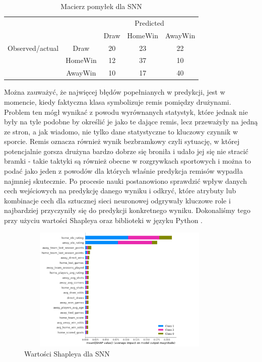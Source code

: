 \begin{center}
\begin{table}[H]
\renewcommand{\arraystretch}{1.5}
\caption{Macierz pomyłek dla SNN}
\label{tab:macierzSNN}
\begin{center}
\begin{tabular}{|c|c|c|c|c|}
   \cline{3-5} 
   \multicolumn{1}{c}{} & & \multicolumn{3}{c|}{Predicted} \\ \cline{3-5}
   \multicolumn{1}{c}{} & & Draw & HomeWin & AwayWin \\ \hline
   
   {Observed/actual}
   & Draw & 20 & 23 & 22 \\ \cline{2-5}
   & HomeWin & 12 & 37 & 10  \\ \cline{2-5}
   & AwayWin & 10 & 17 & 40 \\ \hline
\end{tabular}
\end{center}
\end{table}
\end{center}
Można zauważyć, że najwięcej błędów popełnianych w predykcji, jest w momencie, kiedy faktyczna klasa symbolizuje remis pomiędzy drużynami. Problem ten mógł wynikać z powodu wyrównanych statystyk, które jednak nie były na tyle podobne by określić je jako te dające remis, lecz przeważyły na jedną ze stron, a jak wiadomo, nie tylko dane statystyczne to kluczowy czynnik w sporcie. Remis oznacza również wynik bezbramkowy czyli sytuację, w której potencjalnie gorsza drużyna bardzo dobrze się broniła i udało jej się nie stracić bramki - takie taktyki są również obecne w rozgrywkach sportowych i można to podać jako jeden z powodów dla których właśnie predykcja remisów wypadła najmniej skutecznie.
Po procesie nauki postanowiono sprawdzić wpływ danych cech wejściowych na predykcję danego wyniku i odkryć, które atrybuty lub kombinacje cech dla sztucznej sieci neuronowej odgrywały kluczowe role i najbardziej przyczyniły się do predykcji konkretnego wyniku. Dokonaliśmy tego przy użyciu wartości Shapleya \cite{shapley} oraz biblioteki w języku Python  \cite{NIPS2017_7062}.
\begin{figure}[H] 
        \centering\includegraphics[width=10cm,height=6cm]{figures/ShapSNN.png}
        \caption{Wartości Shapleya dla SNN}\label{Shap-SNN}
\end{figure}
